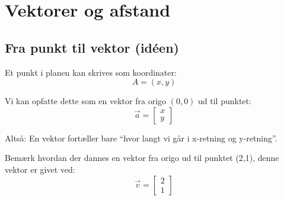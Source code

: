 \section{Vektorer og afstand}

\subsection{Fra punkt til vektor (idéen)}
Et punkt i planen kan skrives som koordinater:
\[
A = (x, y)
\]

Vi kan opfatte dette som en vektor fra origo $(0,0)$ ud til punktet:
\[
\vec{a} =
\begin{bmatrix}
x \\
y
\end{bmatrix}
\]

Altså:  
En vektor fortæller bare “hvor langt vi går i x-retning og y-retning”.

\begin{figure}[H]
    \centering
\end{figure}

Bemærk hvordan der dannes en vektor fra origo ud til punktet (2,1), denne vektor er givet ved:
\begin{equation*}
    \vec{v} = 
    \begin{bmatrix}
        2 \\ 1
    \end{bmatrix}
\end{equation*}

